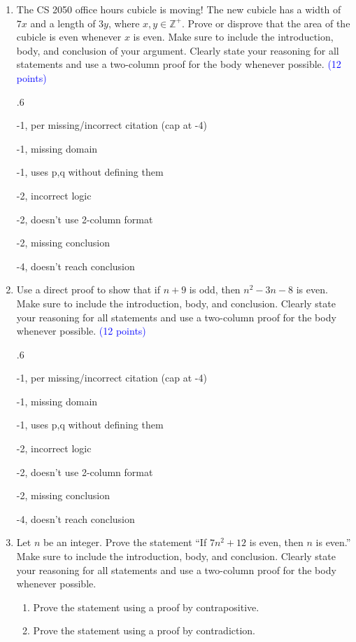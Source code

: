 \documentclass{article}
\newcommand{\pt}[1]{\textcolor{blue}{(#1 points)}}
\newenvironment{rubric}
{
\par
\begin{spacing}{.6}
\begin{itshape}
\color{red}

}
{
\end{itshape}
\end{spacing}
\par
}
\begin{document}
\begin{enumerate}
\item The CS 2050 office hours cubicle is moving! The new cubicle has a width of $7x$ and a length of $3y$, where $x, y \in \mathbb{Z}^+$. Prove or disprove that the area of the cubicle is even whenever $x$ is even. Make sure to include the introduction, body, and conclusion of your argument. Clearly state your reasoning for all statements and use a two-column proof for the body whenever possible. \pt{12}

\begin{rubric}
-1, per missing/incorrect citation (cap at -4)

-1, missing domain

-1, uses p,q without defining them

-2, incorrect logic

-2, doesn't use 2-column format

-2, missing conclusion

-4, doesn't reach conclusion
\end{rubric}

\item Use a direct proof to show that if $n + 9$ is odd, then $n^2-3n-8$ is even. Make sure to include the introduction, body, and conclusion. Clearly state your reasoning for all statements and use a two-column proof for the body whenever possible. \pt{12}

\begin{rubric}
-1, per missing/incorrect citation (cap at -4)

-1, missing domain

-1, uses p,q without defining them

-2, incorrect logic

-2, doesn't use 2-column format

-2, missing conclusion

-4, doesn't reach conclusion
\end{rubric}

\item Let $n$ be an integer. Prove the statement “If $7n^2 + 12$ is even, then $n$ is even.” Make sure to include the introduction, body, and conclusion. Clearly state your reasoning for all statements and use a two-column proof for the body whenever possible. 
\begin{enumerate}
    \item Prove the statement using a proof by contrapositive.
    \item Prove the statement using a proof by contradiction.
\end{enumerate}


\end{enumerate}
\end{document}
